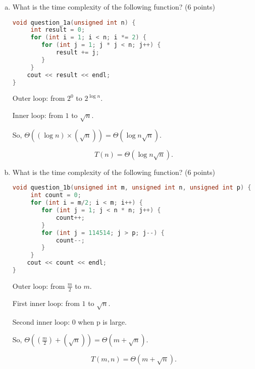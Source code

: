\documentclass[11pt]{exam}
\begin{document}
\begin{enumerate}[(a)] \label{prb:tiger_code}

    \item What is the time complexity of the following function? (6 points)
          \begin{lstlisting}[language=c++]
void question_1a(unsigned int n) {
	 int result = 0;
	 for (int i = 1; i < n; i *= 2) {
	 	for (int j = 1; j * j < n; j++) {
	 		result += j;
	 	}
	 }
	cout << result << endl;
}
\end{lstlisting}

          \begin{solution}

              Outer loop: from $2^0$ to $2^{\log n}$.

              Inner loop: from $1$ to $\sqrt{n}$.

              So,
              $\Theta((\log n )\times(\sqrt{n}))=\Theta(\log n \sqrt{n})$.

              \[
                  T(n)=\Theta(\log n \sqrt{n}).
              \]
          \end{solution}

    \item What is the time complexity of the following function? (6 points)
          \begin{lstlisting}[language=c++]
void question_1b(unsigned int m, unsigned int n, unsigned int p) {
	 int count = 0;
	 for (int i = m/2; i < m; i++) {
	 	for (int j = 1; j < n * n; j++) {
	 		count++;
	 	}
		for (int j = 114514; j > p; j--) {
			count--;
		}	 
	 }
	cout << count << endl;
}
\end{lstlisting}

          \begin{solution}

              Outer loop: from $\frac{m}{2}$ to $m$.

              First inner loop: from $1$ to $\sqrt{n}$.

              Second inner loop: 0 when p is large.

              So,
              $\Theta((\frac{m}{2} ) + (\sqrt{n}))=\Theta(m+\sqrt{n})$.

              \[
                  T(m,n) =     \Theta(m+\sqrt{n}).
              \]
          \end{solution}


\end{enumerate}
\end{document}
